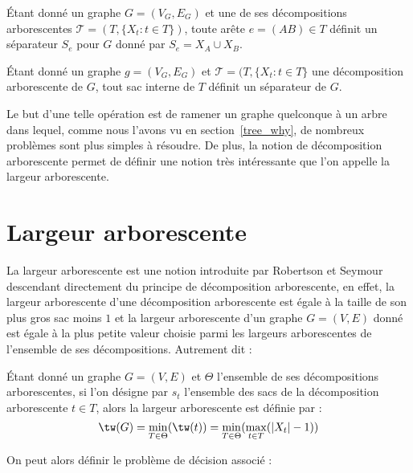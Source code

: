 \begin{nprop}
    \label{esep}
    Étant donné un graphe $G=(V_G,E_G)$ et une de ses décompositions arborescentes $\mathcal{T} =(T, \{X_t
    : t \in T\})$, toute arête $e=(AB) \in T$ définit un séparateur $S_e$ pour $G$ donné par $S_e =
    X_A \cup X_B$.
\end{nprop}

\begin{nprop}
    \label{nsep}
    Étant donné un graphe $g=(V_G, E_G)$ et $\mathcal{T} = (T, \{X_t : t \in T\}$ une décomposition
    arborescente de $G$, tout sac interne de $T$ définit un séparateur de $G$.
\end{nprop}

Le but d'une telle opération est de ramener un graphe quelconque à un arbre dans lequel, comme nous
l'avons vu en section~\ref{tree_why}, de nombreux problèmes sont plus simples à résoudre. De plus,
la notion de décomposition arborescente permet de définir une notion très intéressante que l'on
appelle la largeur arborescente.
\section{Largeur arborescente}

La largeur arborescente est une notion introduite par Robertson et Seymour~\cite{robalgorithmic}
descendant directement du principe de décomposition arborescente, en effet, la largeur arborescente
d'une décomposition arborescente est égale à la taille de son plus gros sac moins $1$ et la largeur
arborescente d'un graphe $G=(V,E)$ donné est égale à la plus petite valeur choisie parmi les
largeurs arborescentes de l'ensemble de ses décompositions. Autrement dit :

\begin{ndf}
    Étant donné un graphe $G=(V,E)$ et $\Theta$ l'ensemble de ses décompositions arborescentes, si l'on
    désigne par $s_t$ l'ensemble des sacs de la décomposition arborescente $t \in T$, alors la
    largeur arborescente est définie par : \[
        \tw(G) = \min_{T\in \Theta}(\tw(t)) = \min_{T\in \Theta}(\max_{t \in T}(|X_t| - 1))
    \]
\end{ndf}

On peut alors définir le problème de décision associé :


